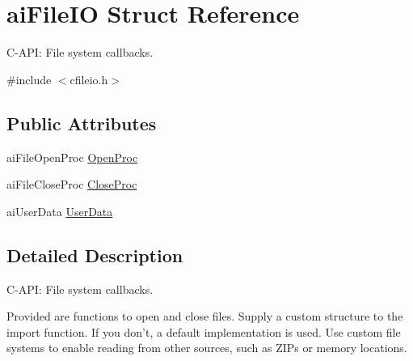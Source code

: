 \hypertarget{structai_file_i_o}{\section{ai\-File\-I\-O Struct Reference}
\label{structai_file_i_o}
}


C-\/\-A\-P\-I\-: File system callbacks.  




{\ttfamily \#include $<$cfileio.\-h$>$}

\subsection*{Public Attributes}
\begin{DoxyCompactItemize}
\item 
ai\-File\-Open\-Proc \hyperlink{structai_file_i_o_a819d9c7823039294125068d06949a6df}{Open\-Proc}
\item 
ai\-File\-Close\-Proc \hyperlink{structai_file_i_o_a7ec702672712b5a02dc49cb17f980a14}{Close\-Proc}
\item 
ai\-User\-Data \hyperlink{structai_file_i_o_a9c62b7f3d70fbb2f41e33ad0b9933139}{User\-Data}
\end{DoxyCompactItemize}


\subsection{Detailed Description}
C-\/\-A\-P\-I\-: File system callbacks. 

Provided are functions to open and close files. Supply a custom structure to the import function. If you don't, a default implementation is used. Use custom file systems to enable reading from other sources, such as Z\-I\-Ps or memory locations. 

